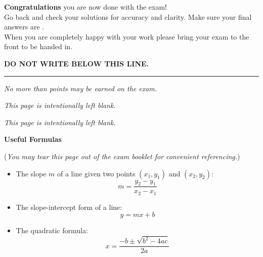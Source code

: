 \documentclass[addpoints,12pt,answers]{exam}
\begin{document}
\newpage

\begin{tcolorbox}[colback=gray!15,colframe=black]
{\Large \textbf{Congratulations} you are now done with the exam!}\\

{Go back and check your solutions for accuracy and clarity.  Make sure your final answers are . }\\

{When you are completely happy with your work please bring your exam to the front to be handed in. }
\end{tcolorbox}

\vspace{1.5cm}

\vfill

\bigskip
\centerline{\textbf{DO NOT WRITE BELOW THIS LINE.}}
\rule{\textwidth}{.2mm}

\vfill

\begin{center}
	\gradetable[v][pages]
	
	\vspace{12pt}
	\textit{No more than \numpoints{} points may be earned on the exam.}
	
\end{center}

\vfill

\newpage
\phantom{.}
\vfill
\begin{center}
   \textit{This page is intentionally left blank}.
\end{center}
\vfill

\newpage
\phantom{.}
\vfill
\begin{center}
   \textit{This page is intentionally left blank}.
\end{center}
\vfill

\newpage

\begin{center}
   {\Large \textbf{Useful Formulas}}
\end{center}

(\textit{You may tear this page out of the exam booklet for convenient referencing.})

\begin{itemize}
   \item The slope $m$ of a line given two points $(x_1,y_1)$ and $(x_2,y_2)$: 
   \[m = \frac{y_2-y_1}{x_2-x_1}\]
   \item The slope-intercept form of a line:
   \[y=mx+b\]
   \item The quadratic formula:
   \[x = \frac{-b\pm\sqrt{b^2-4ac}}{2a}\]
\end{itemize}
\end{document}
